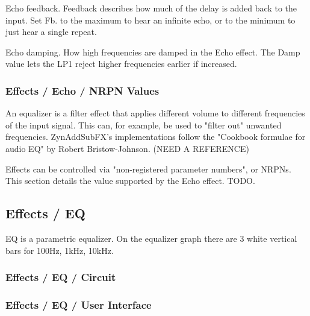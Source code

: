   Echo feedback.
   Feedback describes how much of the delay is added back to the input.
   Set Fb. to the maximum to hear an infinite echo, or to the minimum to
   just hear a single repeat.

   Echo damping.
   How high frequencies are damped in the Echo effect.
   The Damp value lets the LP1 reject higher frequencies earlier if
   increased.

\subsubsection{Effects / Echo / NRPN Values}
\label{subsubsec:effects_edit_echo_nrpn}

   An equalizer is a filter effect that applies different volume to different
   frequencies of the input signal. This can, for example, be used to "filter
   out" unwanted frequencies. ZynAddSubFX’s implementations follow the
   "Cookbook formulae for audio EQ" by Robert Bristow-Johnson.
   (NEED A REFERENCE)

   Effects can be controlled via "non-registered parameter numbers", or NRPNs.
   This section details the value supported by the Echo effect.  TODO.

\subsection{Effects / EQ}
\label{subsec:effects_edit_eq}

   EQ is a parametric equalizer. On the equalizer graph there are 3 white
   vertical bars for 100Hz, 1kHz, 10kHz.

\subsubsection{Effects / EQ / Circuit}
\label{subsubsec:effects_edit_eq_circuit}

%

\subsubsection{Effects / EQ / User Interface}
\label{subsubsec:effects_edit_eq_ui}

